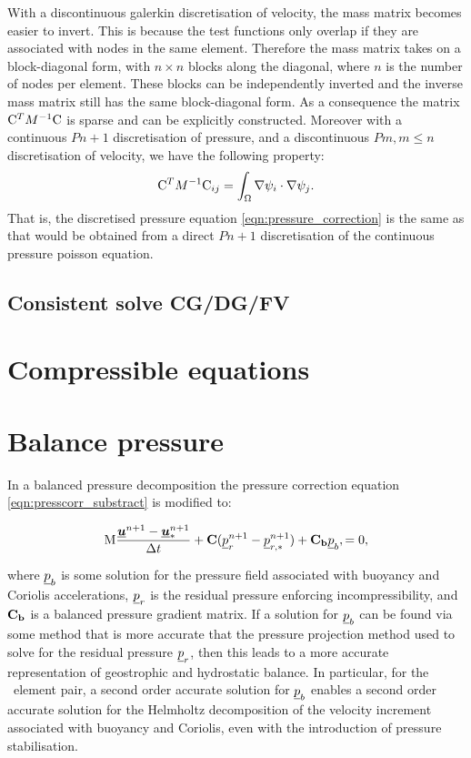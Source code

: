 With a discontinuous galerkin discretisation of velocity, the mass matrix
becomes easier to invert. This is because the test functions only overlap
if they are associated with nodes in the same element. Therefore the mass
matrix takes on a block-diagonal form, with $n\times n$ blocks along 
the diagonal, where $n$ is the number of nodes per element. These blocks
can be independently inverted and the inverse mass matrix still has the 
same block-diagonal form. As a consequence the matrix 
$\mathrm{C}^T M^{-1} \mathrm{C}$ is sparse and can be explicitly 
constructed. Moreover with a continuous $Pn+1$ discretisation of pressure,
and a discontinuous $Pm, m\leq n$ discretisation of velocity, we 
have the following property\citep{cotter2009}:
\begin{equation*}
  \mathrm{C}^T M^{-1} \mathrm{C}_{ij}=\int_\Omega \nabla \psi_i\cdot\nabla \psi_j.
\end{equation*}
That is, the discretised pressure equation \eqref{eqn:pressure_correction}
is the same as that would be obtained from a direct $Pn+1$ 
discretisation of the continuous pressure poisson equation.

\subsection{Consistent solve CG/DG/FV}

\section{Compressible equations}

\section{Balance pressure}
\label{Sect:balance_pressure}

In a balanced pressure decomposition the pressure correction equation \eqref{eqn:presscorr_substract}
is modified to:

\begin{equation}\label{eqn:bp_projection}
\mathrm{M}  \frac{{\underline{{\mbox{\boldmath$u$}}}^{n+1}-\underline{{\mbox{\boldmath$u$}}}_*^{n+1}}}{\Delta t}
    + {\mbox{\boldmath$\mathrm{C}$}} ( \underline{p}_r^{n+1} - \underline{p}_{r,*}^{n+1}) + {\mbox{\boldmath$\mathrm{C_b}$}} \underline{p}_b,
    =0,
\end{equation}

where $\underline{p}_b$ is some solution for the pressure field associated with buoyancy
and Coriolis accelerations, $\underline{p}_r$ is the residual pressure enforcing
incompressibility, and ${\mbox{\boldmath$\mathrm{C_b}$}}$ is a balanced pressure
gradient matrix. If a solution for $\underline{p}_b$ can be found via some method that
is more accurate that the pressure projection method used to solve for the
residual pressure $\underline{p}_r$, then this leads to a more accurate representation of
geostrophic and hydrostatic balance. In particular, for the \Poo\
element pair, a second order accurate solution
for $\underline{p}_b$ enables a second order accurate solution for the Helmholtz decomposition
of the velocity increment associated with buoyancy and Coriolis, even with the introduction of
pressure stabilisation.

